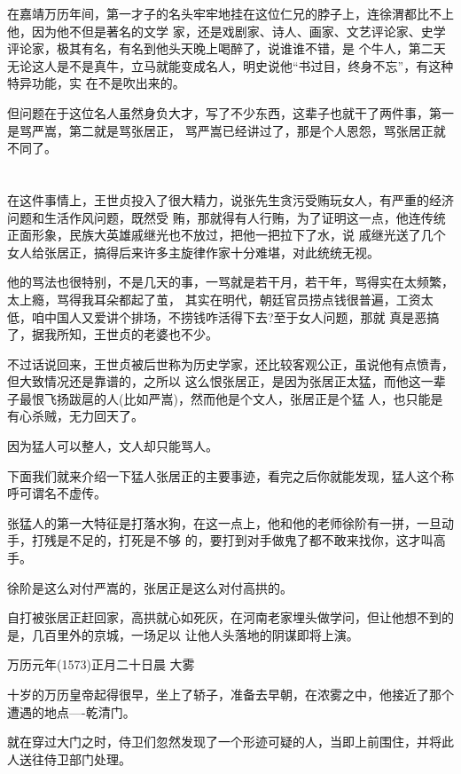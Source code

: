 \documentclass[11pt,a4paper,onecolumn]{article}
\begin{document}
在嘉靖万历年间，第一才子的名头牢牢地挂在这位仁兄的脖子上，连徐渭都比不上他，因为他不但是著名的文学
家，还是戏剧家、诗人、画家、文艺评论家、史学评论家，极其有名，有名到他头天晚上喝醉了，说谁谁不错，是
个牛人，第二天无论这人是不是真牛，立马就能变成名人，明史说他``书过目，终身不忘''，有这种特异功能，实
在不是吹出来的。

但问题在于这位名人虽然身负大才，写了不少东西，这辈子也就干了两件事，第一是骂严嵩，第二就是骂张居正，
骂严嵩已经讲过了，那是个人恩怨，骂张居正就不同了。

\section[\thesection]{}

在这件事情上，王世贞投入了很大精力，说张先生贪污受贿玩女人，有严重的经济问题和生活作风问题，既然受
贿，那就得有人行贿，为了证明这一点，他连传统正面形象，民族大英雄戚继光也不放过，把他一把拉下了水，说
戚继光送了几个女人给张居正，搞得后来许多主旋律作家十分难堪，对此统统无视。

他的骂法也很特别，不是几天的事，一骂就是若干月，若干年，骂得实在太频繁，太上瘾，骂得我耳朵都起了茧，
其实在明代，朝廷官员捞点钱很普遍，工资太低，咱中国人又爱讲个排场，不捞钱咋活得下去?至于女人问题，那就
真是恶搞了，据我所知，王世贞的老婆也不少。

不过话说回来，王世贞被后世称为历史学家，还比较客观公正，虽说他有点愤青，但大致情况还是靠谱的，之所以
这么恨张居正，是因为张居正太猛，而他这一辈子最恨飞扬跋扈的人(比如严嵩)，然而他是个文人，张居正是个猛
人，也只能是有心杀贼，无力回天了。

因为猛人可以整人，文人却只能骂人。

下面我们就来介绍一下猛人张居正的主要事迹，看完之后你就能发现，猛人这个称呼可谓名不虚传。

张猛人的第一大特征是打落水狗，在这一点上，他和他的老师徐阶有一拼，一旦动手，打残是不足的，打死是不够
的，要打到对手做鬼了都不敢来找你，这才叫高手。

徐阶是这么对付严嵩的，张居正是这么对付高拱的。

自打被张居正赶回家，高拱就心如死灰，在河南老家埋头做学问，但让他想不到的是，几百里外的京城，一场足以
让他人头落地的阴谋即将上演。

万历元年(1573)正月二十日晨 大雾

十岁的万历皇帝起得很早，坐上了轿子，准备去早朝，在浓雾之中，他接近了那个遭遇的地点----乾清门。

就在穿过大门之时，侍卫们忽然发现了一个形迹可疑的人，当即上前围住，并将此人送往侍卫部门处理。
\end{document}
